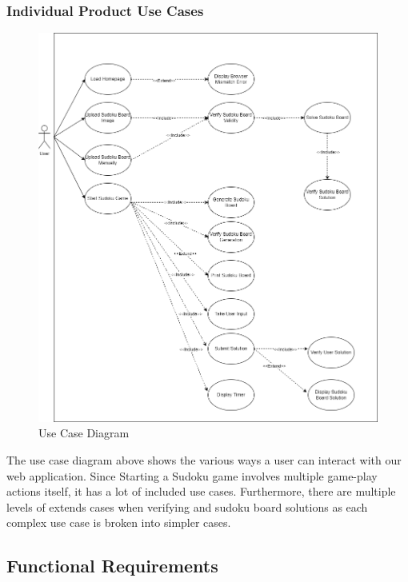 \documentclass[11pt]{article}
\begin{document}
\subsubsection{Individual Product Use Cases}
\begin{figure}[H]
    \centering
    \includegraphics[width=\textwidth]{use_case}
    \caption{Use Case Diagram}
    \label{fig:my_label}
\end{figure}
The use case diagram above shows the various ways a user can interact with our web application. Since Starting a Sudoku game involves multiple game-play actions itself, it has a lot of included use cases. Furthermore, there are multiple levels of extends cases when verifying and sudoku board solutions as each complex use case is broken into simpler cases.
\newpage

\subsection{Functional Requirements}
\end{document}
